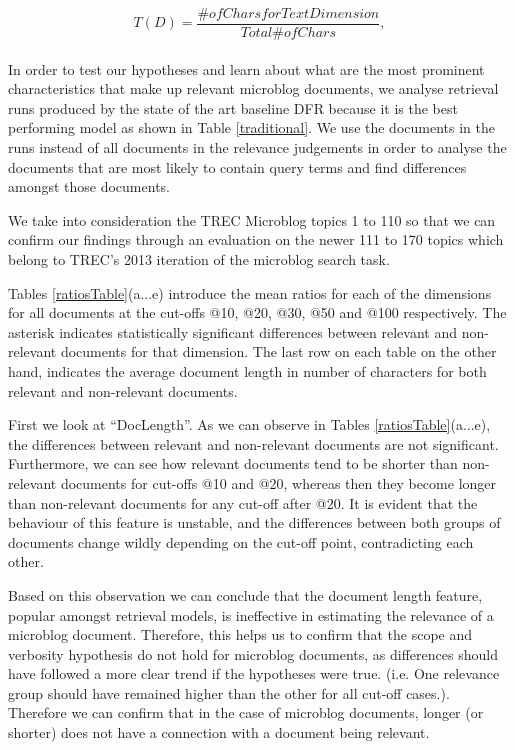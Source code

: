 \begin{equation}
	T(D)= \frac{\# of Chars for Text Dimension}{ Total \# of Chars},
\end{equation}\\



In order to test our hypotheses and learn about what are the most prominent characteristics that make up relevant microblog documents, we analyse retrieval runs produced by the state of the art baseline DFR because it is the best performing model as shown in Table \ref{traditional}. We use the documents in the runs instead of all documents in the relevance judgements in order to analyse the documents that are most likely to contain query terms and find differences amongst those documents.

We take into consideration the TREC Microblog topics 1 to 110 so that we can confirm our findings through an evaluation on the newer 111 to 170 topics which belong to TREC's 2013 iteration of the microblog search task.











Tables \ref{ratiosTable}(a...e) introduce the mean ratios for each of the dimensions for all documents at the cut-offs @10, @20, @30, @50 and @100 respectively. The asterisk indicates statistically significant differences between relevant and non-relevant documents for that dimension. The last row on each table on the other hand, indicates the average document length in number of characters for both relevant and non-relevant documents.



First we look at ``DocLength''. As we can observe in Tables \ref{ratiosTable}(a...e), the differences between relevant and non-relevant documents are not significant. Furthermore, we can see how relevant documents tend to be shorter than non-relevant documents for cut-offs @10 and @20, whereas then they become longer than non-relevant documents for any cut-off after @20. It is evident that the behaviour of this feature is unstable, and the differences between both groups of documents change wildly depending on the cut-off point, contradicting each other.



Based on this observation we can conclude that the document length feature, popular amongst retrieval models, is ineffective in estimating the relevance of a microblog document. Therefore, this helps us to confirm that the scope and verbosity hypothesis do not hold for microblog documents, as differences should have followed a more clear trend if the hypotheses were true. (i.e. One relevance group should have remained higher than the other for all cut-off cases.). Therefore we can confirm that in the case of microblog documents, longer (or shorter) does not have a connection with a document being relevant. 



